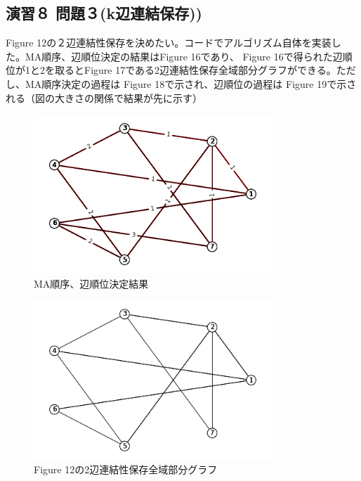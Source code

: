 \documentclass{report}
\begin{document}
\begin{CJK}{UTF8}{min}
    \section*{演習８ 問題３(k辺連結保存))}
    Figure 12の２辺連結性保存を決めたい。コードでアルゴリズム自体を実装した。MA順序、辺順位決定の結果はFigure 16であり、
    Figure 16で得られた辺順位が1と2を取るとFigure 17である2辺連結性保存全域部分グラフができる。ただし、MA順序決定の過程は
    Figure 18で示され、辺順位の過程は Figure 19で示される（図の大きさの関係で結果が先に示す）
    \begin{figure}[!h]
        \centerline{\includegraphics[width=0.8\textwidth]{data/ex-8-F-7.png}}
        \caption{MA順序、辺順位決定結果}
    \end{figure}
    
    \begin{figure}[!h]
        \centerline{\includegraphics[width=0.8\textwidth]{data/ex-8-2S.png}}
        \caption{Figure 12の2辺連結性保存全域部分グラフ}
    \end{figure}


\end{CJK}
\end{document}
